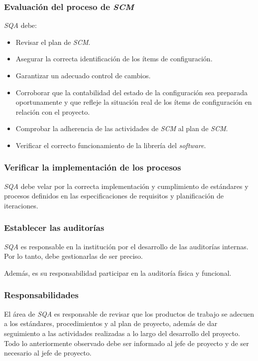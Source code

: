 \subsubsection{Evaluación del proceso de \emph{SCM}}

\emph{SQA} debe:

\begin{itemize}
		\item 
		Revisar el plan de \emph{SCM}.
		\item 
		Asegurar la correcta identificación de los ítems de configuración.
		\item 
		Garantizar un adecuado control de cambios.
		\item 
		Corroborar que la contabilidad del estado de la configuración sea preparada oportunamente y que refleje la situación real de los ítems de configuración en relación con el proyecto.
		\item 
		Comprobar la adherencia de las actividades de \emph{SCM} al plan de \emph{SCM}.
		\item 
		Verificar el correcto funcionamiento de la librería del \emph{software}.
	\end{itemize}

\subsubsection{Verificar la implementación de los procesos}

\emph{SQA} debe velar por la correcta implementación y cumplimiento de estándares y procesos definidos en las especificaciones de requisitos y planificación de iteraciones.

\subsubsection{Establecer las auditorías}

\emph{SQA} es responsable en la institución por el desarrollo de las auditorías internas. Por lo tanto, debe gestionarlas de ser preciso.

Además, es su responsabilidad participar en la auditoría física y funcional.

\subsubsection{Responsabilidades}

El área de \emph{SQA} es responsable de revisar que los productos de trabajo se adecuen a los estándares, procedimientos y al plan de proyecto, además de dar seguimiento a las actividades realizadas a lo largo del desarrollo del proyecto. Todo lo anteriormente observado debe ser informado al jefe de proyecto y de ser necesario al jefe de proyecto.

